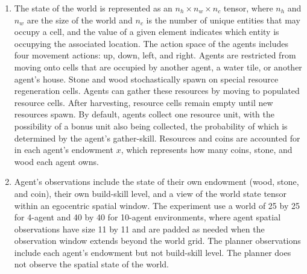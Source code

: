 \documentclass{article}
\begin{document}
\begin{enumerate}
\item The state of the world is represented as an \( n_{h} \times n_{w} \times n_{c} \) tensor, where \( n_{h} \) and \( n_{w} \) are the size of the world and \( n_{c} \) is the number of unique entities that may occupy a cell, and the value of a given element indicates which entity is occupying the associated location. The action space of the agents includes four movement actions: up, down, left, and right. Agents are restricted from moving onto cells that are occupied by another agent, a water tile, or another agent’s house. Stone and wood stochastically spawn on special resource regeneration cells. Agents can gather these resources by moving to populated resource cells. After harvesting, resource cells remain empty until new resources spawn. By default, agents collect one resource unit, with the possibility of a bonus unit also being collected, the probability of which is determined by the agent’s gather-skill. Resources and coins are accounted for in each agent’s endowment \( x \), which represents how many coins, stone, and wood each agent owns.

\item Agent's observations include the state of their own endowment (wood, stone, and coin), their own build-skill level, and a view of the world state tensor within an egocentric spatial window. The experiment use a world of 25 by 25 for 4-agent and 40 by 40 for 10-agent environments, where agent spatial observations have size 11 by 11 and are padded as needed when the observation window extends beyond the world grid. The planner observations include each agent’s endowment but not build-skill level. The planner does not observe the spatial state of the world.


\end{enumerate}
\end{document}
